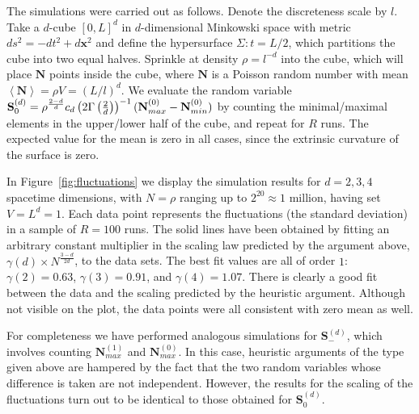 \documentclass[12pt]{article}
\begin{document}

 
The simulations were carried out as follows. Denote the discreteness scale by $l$. Take a $d$-cube $[0,L]^d$ in $d$-dimensional Minkowski space with metric $ds^2=-dt^2+d{\mathbf x}^2$ and define the hypersurface $\Sigma: t=L/2$, which partitions the cube into two equal halves. Sprinkle at density $\rho=l^{-d}$ into the cube, which will place $\mathbf N$ points inside the cube, where $\mathbf N$ is a Poisson random number with mean $\left< \mathbf N\right> = \rho V=  (L/l)^d$. We evaluate the random variable $\mathbf S^{(d)}_{0}=\rho^\frac{2-d}{d}c_d\left(2\Gamma\left(\frac{2}{d}\right)\right)^{-1}(\mathbf N^{(0)}_{\vphantom{i}max} - \mathbf N_{min}^{(0)})$ by counting the minimal/maximal elements in the upper/lower half of the cube, and repeat for $R$ runs. The expected value for the mean is zero in all cases, since the extrinsic curvature of the surface is zero. 

In Figure~\ref{fig:fluctuations} we display the simulation results for $d=2,3,4$ spacetime dimensions, with $N=\rho$ ranging up to $2^{20}\approx 1$ million, having set $V=L^d=1$. Each data point represents the fluctuations (the standard deviation) in a sample of $R=100$ runs. The solid lines have been obtained by fitting an arbitrary constant multiplier in the scaling law predicted by the argument above, $\gamma(d)\times N^\frac{3-d}{2d}$, to the data sets. The best fit values are all of order $1$: $\gamma(2)=0.63$, $\gamma(3)=0.91$, and $\gamma(4)=1.07$.
There is clearly a good fit between the data and the scaling predicted by the heuristic argument. Although not visible on the plot, the data points were all consistent with zero mean as well.

For completeness we have performed analogous simulations for $\mathbf S^{(d)}_-$, which involves counting $\mathbf N^{(1)}_{max}$ and $\mathbf N^{(0)}_{max}$. In this case, heuristic arguments of the type given above are hampered by the fact that the two random variables whose difference is taken are not independent. However, the results for the scaling of the fluctuations turn out to be identical to those obtained for $\mathbf S^{(d)}_0$. 
\end{document}
